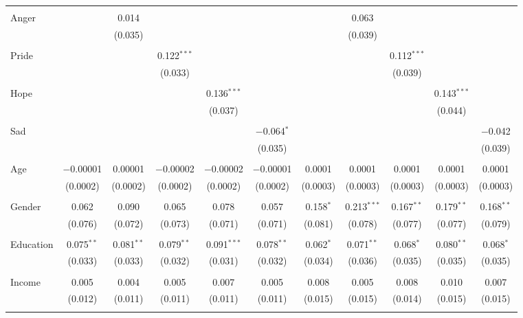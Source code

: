 \begin{table}[!htbp]
\begin{tabular}{@{\extracolsep{5pt}}lcccccccccc}
  & & & & & & & & & & \\ 
 Anger &  & 0.014 &  &  &  &  & 0.063 &  &  &  \\ 
  &  & (0.035) &  &  &  &  & (0.039) &  &  &  \\ 
  & & & & & & & & & & \\ 
 Pride &  &  & 0.122$^{***}$ &  &  &  &  & 0.112$^{***}$ &  &  \\ 
  &  &  & (0.033) &  &  &  &  & (0.039) &  &  \\ 
  & & & & & & & & & & \\ 
 Hope &  &  &  & 0.136$^{***}$ &  &  &  &  & 0.143$^{***}$ &  \\ 
  &  &  &  & (0.037) &  &  &  &  & (0.044) &  \\ 
  & & & & & & & & & & \\ 
 Sad &  &  &  &  & $-$0.064$^{*}$ &  &  &  &  & $-$0.042 \\ 
  &  &  &  &  & (0.035) &  &  &  &  & (0.039) \\ 
  & & & & & & & & & & \\ 
 Age & $-$0.00001 & 0.00001 & $-$0.00002 & $-$0.00002 & $-$0.00001 & 0.0001 & 0.0001 & 0.0001 & 0.0001 & 0.0001 \\ 
  & (0.0002) & (0.0002) & (0.0002) & (0.0002) & (0.0002) & (0.0003) & (0.0003) & (0.0003) & (0.0003) & (0.0003) \\ 
  & & & & & & & & & & \\ 
 Gender & 0.062 & 0.090 & 0.065 & 0.078 & 0.057 & 0.158$^{*}$ & 0.213$^{***}$ & 0.167$^{**}$ & 0.179$^{**}$ & 0.168$^{**}$ \\ 
  & (0.076) & (0.072) & (0.073) & (0.071) & (0.071) & (0.081) & (0.078) & (0.077) & (0.077) & (0.079) \\ 
  & & & & & & & & & & \\ 
 Education & 0.075$^{**}$ & 0.081$^{**}$ & 0.079$^{**}$ & 0.091$^{***}$ & 0.078$^{**}$ & 0.062$^{*}$ & 0.071$^{**}$ & 0.068$^{*}$ & 0.080$^{**}$ & 0.068$^{*}$ \\ 
  & (0.033) & (0.033) & (0.032) & (0.031) & (0.032) & (0.034) & (0.036) & (0.035) & (0.035) & (0.035) \\ 
  & & & & & & & & & & \\ 
 Income & 0.005 & 0.004 & 0.005 & 0.007 & 0.005 & 0.008 & 0.005 & 0.008 & 0.010 & 0.007 \\ 
  & (0.012) & (0.011) & (0.011) & (0.011) & (0.011) & (0.015) & (0.015) & (0.014) & (0.015) & (0.015) \\ 
  & & & & & & & & & & \\ 

\end{tabular}
\end{table}
